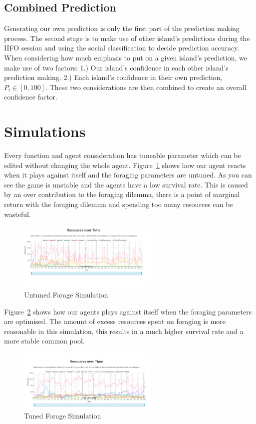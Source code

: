 \subsection{Combined Prediction}
Generating our own prediction is only the first part of the prediction making process. The second stage is to make use of other island's predictions during the IIFO session and using the social classification to decide prediction accuracy. When considering how much emphasis to put on a given island's prediction, we make use of two factors: 1.) Our island's confidence in each other island's prediction making. 2.) Each island's confidence in their own prediction, $P_i \in [0,100]$. These two considerations are then combined to create an overall confidence factor.

\section{Simulations}
Every function and agent consideration has tuneable parameter which can be edited without changing the whole agent. Figure~\ref{fig: Forage Untuned} shows how our agent reacts when it plays against itself and the foraging parameters are untuned. As you can see the game is unstable and the agents have a low survival rate. This is caused by an over contribution to the foraging dilemma, there is a point of marginal return with the foraging dilemma and spending too many resources can be wasteful. 

\begin{figure}[!htb]
    \centering
    \includegraphics[width=0.6\textwidth]{10_team2_agentdesign/images/Forage Untuned.png}
    \caption{Untuned Forage Simulation}
    \label{fig: Forage Untuned}
\end{figure}

Figure~\ref{fig: Forage tuned} shows how our agents plays against itself when the foraging parameters are optimised. The amount of excess resources spent on foraging is more reasonable in this simulation, this results in a much higher survival rate and a more stable common pool.

\begin{figure}[!htb]
    \centering
    \includegraphics[width=0.6\textwidth]{10_team2_agentdesign/images/Forage tuned.png}
    \caption{Tuned Forage Simulation}
    \label{fig: Forage tuned}
\end{figure}

